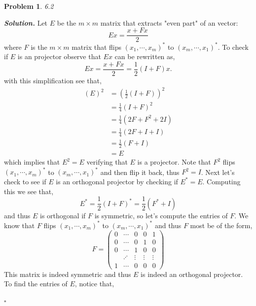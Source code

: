 \documentclass[12pt]{report}
\newtheorem{problem}{Problem}
\newenvironment{solution}[1][\it{Solution}]{\textbf{#1. } }{$\square$}
\begin{document}
\newpage



\begin{problem}
    6.2
\end{problem}

\begin{solution}
    \noindent
    Let $E$ be the $m\times m$ matrix that extracts "even part" of an vector:
    \[ 
        Ex = \frac{x + Fx}{2}
    \]
    where $F$ is the $m \times m$ matrix that flips $(x_1, \cdots, x_m)^*$ to $(x_m, \cdots, x_1)^*$. To check if $E$ is an projector observe that $Ex$ can be rewritten as,
    \[ 
        Ex = \frac{x + Fx}{2} = \frac{1}{2}\left(I + F\right)x.
    \]
    with this simplification see that,
    \begin{align*}
        (E)^2 &= \left( \frac{1}{2}(I + F)\right)^2\\
        &= \frac{1}{4} \left(I + F\right)^2\\
        &= \frac{1}{4} \left(2F + F^2 + 2I\right)\\
        &= \frac{1}{4} \left(2F + I + I\right)\\
        &= \frac{1}{2} \left(F + I\right)\\
        &= E
    \end{align*}
    which implies that $E^2 = E$ verifying that $E$ is a projector. Note that $F^2$ flips $(x_1, \cdots, x_m)^*$ to $(x_m, \cdots, x_1)^*$ and then flip it back, thus $F^2 = I$. Next let's check to see if $E$ is an orthogonal projector by checking if $E^* = E$. Computing this we see that,
    \[E^* = \frac{1}{2}(I + F)^* = \frac{1}{2}(F^* +I) \]
    and thus $E$ is orthogonal if $F$ is symmetric, so let's compute the entries of $F$. We know that $F$ flips $(x_1, \cdots, x_m)^*$ to $(x_m, \cdots, x_1)^*$ and thus $F$ most be of the form,
    \[
        F = \begin{pmatrix}
             0&\cdots&0&0&1\\
             0&\cdots&0&1&0\\
             0&\cdots&1&0&0\\
             &\iddots&\vdots&\vdots&\vdots\\
             1&\cdots&0&0&0
        \end{pmatrix}
    \] 
    This matrix is indeed symmetric and thus $E$ is indeed an orthogonal projector. To find the entries of $E$, notice that, 

\end{solution}
\end{document}
